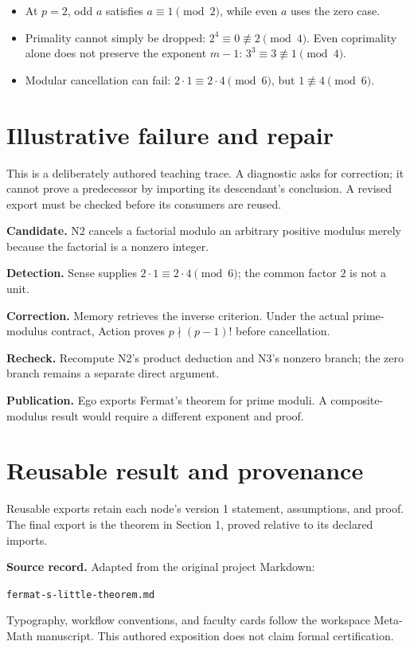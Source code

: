 \documentclass[preprint,12pt,aps,pra,showkeys,amsmath,amssymb,superscriptaddress,floatfix]{revtex4-2}
\theoremstyle{definition}
\theoremstyle{remark}
\newcommand{\field}[2]{\par\smallskip\noindent\textbf{#1.} #2\par}
\begin{document}
\begin{itemize}
\item
  At \(p=2\), odd \(a\) satisfies \(a\equiv1\pmod2\), while even \(a\)
  uses the zero case.
\item
  Primality cannot simply be dropped: \(2^4\equiv0\not\equiv2\pmod4\).
  Even coprimality alone does not preserve the exponent \(m-1\):
  \(3^3\equiv3\not\equiv1\pmod4\).
\item
  Modular cancellation can fail: \(2\cdot1\equiv2\cdot4\pmod6\), but
  \(1\not\equiv4\pmod6\).
\end{itemize}

\section{Illustrative failure and repair}

This is a deliberately authored teaching trace. A diagnostic asks for
correction; it cannot prove a predecessor by importing its descendant's
conclusion. A revised export must be checked before its consumers are
reused.

\field{Candidate}{N2 cancels a factorial modulo an arbitrary positive modulus merely
because the factorial is a nonzero integer.}

\field{Detection}{Sense supplies \(2\cdot1\equiv2\cdot4\pmod6\); the common factor \(2\)
is not a unit.}

\field{Correction}{Memory retrieves the inverse criterion. Under the actual prime-modulus
contract, Action proves \(p\nmid(p-1)!\) before cancellation.}

\field{Recheck}{Recompute N2's product deduction and N3's nonzero branch; the zero
branch remains a separate direct argument.}

\field{Publication}{Ego exports Fermat's theorem for prime moduli. A composite-modulus
result would require a different exponent and proof.}

\section{Reusable result and provenance}
Reusable exports retain each node's version 1 statement, assumptions, and proof.
The final export is the theorem in Section 1, proved relative to its declared imports.

\smallskip\noindent\textbf{Source record.} Adapted from the original project Markdown:
\par\noindent\nolinkurl{fermat-s-little-theorem.md}\par
Typography, workflow conventions, and faculty cards follow the workspace Meta-Math
manuscript. This authored exposition does not claim formal certification.
\end{document}
